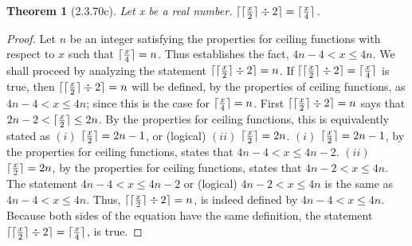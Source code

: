 \documentclass[a4paper, 12pt]{article}
\theoremstyle{plain}
\newtheorem*{theorem*}{Theorem}
\DeclarePairedDelimiter{\ceil}{\lceil}{\rceil}
\begin{document}
	
	\begin{theorem*}[2.3.70c]
		Let x be a real number. $\ceil{\ceil{\frac{x}{2}} \div 2} = \ceil{\frac{x}{4}}$.
	\end{theorem*}
	
	\begin{proof}
		Let $n$ be an integer satisfying the properties for ceiling functions with respect to $x$ 
		such that $\ceil{\frac{x}{4}} = n$. Thus establishes the fact, $4n - 4 < x \le 4n$. We 
		shall proceed by analyzing the statement $\ceil{\ceil{\frac{x}{2}} \div 2} = n$. If 
		$\ceil{\ceil{\frac{x}{2}} \div 2} = \ceil{\frac{x}{4}}$ is true, then 
		$\ceil{\ceil{\frac{x}{2}} \div 2} = n$ will be defined, by the properties of ceiling 
		functions, as $4n - 4 < x \le 4n$; since this is the case for $\ceil{\frac{x}{4}} = n$.
		\newline
		\newline
		First $\ceil{\ceil{\frac{x}{2}} \div 2} = n$ says that $2n - 2 < \ceil{\frac{x}{2}} \le 2n$. 
		By the properties for ceiling functions, this is equivalently stated as 
		$(i)$ $\ceil{\frac{x}{2}} = 2n - 1$, or (logical) $(ii)$ $\ceil{\frac{x}{2}} = 2n$.
		\newline
		\newline
		\indent $(i)$ $\ceil{\frac{x}{2}} = 2n - 1$, by the properties for ceiling functions, states 
		that \indent $4n - 4 < x \le 4n - 2$.
		\newline
		\newline
		\indent $(ii)$ $\ceil{\frac{x}{2}} = 2n$, by the properties for ceiling functions, states 
		that \newline \indent $4n - 2 < x \le 4n$.
		\newline
		\newline
		The statement $4n - 4 < x \le 4n - 2$ or (logical) $4n - 2 < x \le 4n$ is the same as 
		$4n - 4 < x \le 4n$. Thus, $\ceil{\ceil{\frac{x}{2}} \div 2} = n$, is indeed defined by 
		$4n - 4 < x \le 4n$. Because both sides of the equation have the same definition, the statement 
		$\ceil{\ceil{\frac{x}{2}} \div 2} = \ceil{\frac{x}{4}}$, is true.
	\end{proof}
\end{document}
